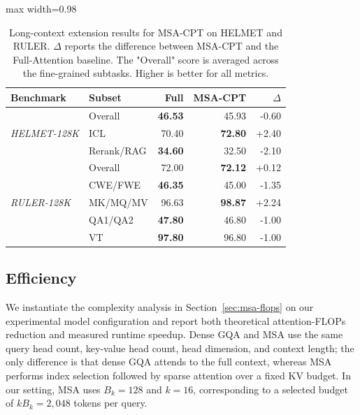 \documentclass{llmxive}
\providecommand{\method}{\textsc{MSA}}
\providecommand{\arraystretch}{0.92}
\providecommand{\Secref}[1]{Section~\ref{#1}}
\begin{document}
\begin{table}[!htbp]
\centering
{\small
\renewcommand{\arraystretch}{0.92}
\begin{adjustbox}{max width=0.98\linewidth}
\begin{tabular}{llrrr}
\toprule
Benchmark & Subset & Full & \method{}-CPT & $\Delta$ \\
\midrule
\multirow{3}{*}{\textit{HELMET-128K}} & Overall & \textbf{46.53} & 45.93 & -0.60 \\
 & ICL & 70.40 & \textbf{72.80} & +2.40 \\
 & Rerank/RAG & \textbf{34.60} & 32.50 & -2.10 \\
\midrule
\multirow{5}{*}{\textit{RULER-128K}} & Overall & 72.00 & \textbf{72.12} & +0.12 \\
 & CWE/FWE & \textbf{46.35} & 45.00 & -1.35 \\
 & MK/MQ/MV & 96.63 & \textbf{98.87} & +2.24 \\
 & QA1/QA2 & \textbf{47.80} & 46.80 & -1.00 \\
 & VT & \textbf{97.80} & 96.80 & -1.00 \\
\bottomrule
\end{tabular}
\end{adjustbox}
}
\caption{Long-context extension results for \method{}-CPT on HELMET and RULER. \(\Delta\) reports the difference between \method{}-CPT and the Full-Attention baseline. The "Overall" score is averaged across the fine-grained subtasks. Higher is better for all metrics.}
\label{tab:lctx-main}
\end{table}

\subsection{Efficiency}
\label{sec:experiment-efficiency}

We instantiate the complexity analysis in \Secref{sec:msa-flops} on our experimental model configuration and report both theoretical attention-FLOPs reduction and measured runtime speedup. Dense GQA and \method{} use the same query head count, key-value head count, head dimension, and context length; the only difference is that dense GQA attends to the full context, whereas \method{} performs index selection followed by sparse attention over a fixed KV budget. In our setting, \method{} uses $B_k=128$ and $k=16$, corresponding to a selected budget of $k B_k=2{,}048$ tokens per query.
\end{document}
